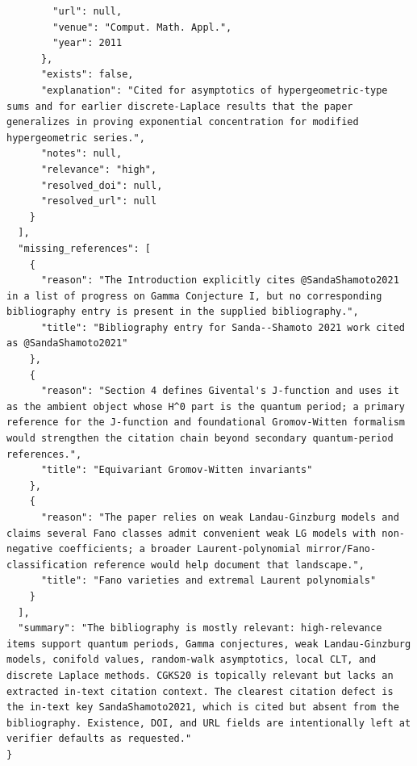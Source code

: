 \documentclass[11pt]{article}
\begin{document}
\begin{verbatim}
        "url": null,
        "venue": "Comput. Math. Appl.",
        "year": 2011
      },
      "exists": false,
      "explanation": "Cited for asymptotics of hypergeometric-type sums and for earlier discrete-Laplace results that the paper generalizes in proving exponential concentration for modified hypergeometric series.",
      "notes": null,
      "relevance": "high",
      "resolved_doi": null,
      "resolved_url": null
    }
  ],
  "missing_references": [
    {
      "reason": "The Introduction explicitly cites @SandaShamoto2021 in a list of progress on Gamma Conjecture I, but no corresponding bibliography entry is present in the supplied bibliography.",
      "title": "Bibliography entry for Sanda--Shamoto 2021 work cited as @SandaShamoto2021"
    },
    {
      "reason": "Section 4 defines Givental's J-function and uses it as the ambient object whose H^0 part is the quantum period; a primary reference for the J-function and foundational Gromov-Witten formalism would strengthen the citation chain beyond secondary quantum-period references.",
      "title": "Equivariant Gromov-Witten invariants"
    },
    {
      "reason": "The paper relies on weak Landau-Ginzburg models and claims several Fano classes admit convenient weak LG models with non-negative coefficients; a broader Laurent-polynomial mirror/Fano-classification reference would help document that landscape.",
      "title": "Fano varieties and extremal Laurent polynomials"
    }
  ],
  "summary": "The bibliography is mostly relevant: high-relevance items support quantum periods, Gamma conjectures, weak Landau-Ginzburg models, conifold values, random-walk asymptotics, local CLT, and discrete Laplace methods. CGKS20 is topically relevant but lacks an extracted in-text citation context. The clearest citation defect is the in-text key SandaShamoto2021, which is cited but absent from the bibliography. Existence, DOI, and URL fields are intentionally left at verifier defaults as requested."
}
\end{verbatim}
\end{document}
